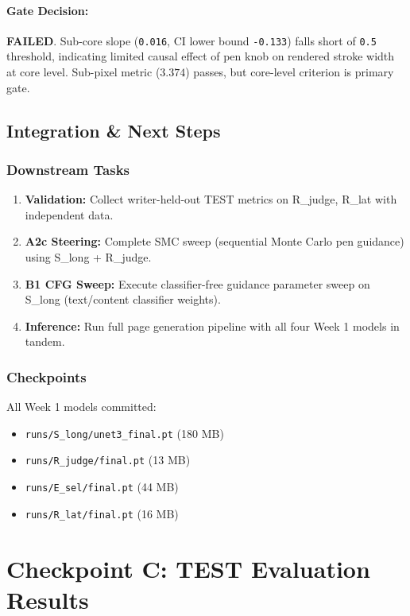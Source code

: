 \documentclass[10.5pt,a4paper]{article}
\newcommand{\fp}[1]{\nolinkurl{#1}}
\begin{document}
\paragraph{Gate Decision:} \textbf{FAILED}. Sub-core slope (\texttt{0.016}, CI lower bound \texttt{-0.133}) falls short of \texttt{0.5} threshold, indicating limited causal effect of pen knob on rendered stroke width at core level. Sub-pixel metric ($3.374$) passes, but core-level criterion is primary gate.

\subsection{Integration \& Next Steps}

\subsubsection{Downstream Tasks}

\begin{enumerate}
    \item \textbf{Validation:} Collect writer-held-out TEST metrics on R\_judge, R\_lat with independent data.
    \item \textbf{A2c Steering:} Complete SMC sweep (sequential Monte Carlo pen guidance) using S\_long + R\_judge.
    \item \textbf{B1 CFG Sweep:} Execute classifier-free guidance parameter sweep on S\_long (text/content classifier weights).
    \item \textbf{Inference:} Run full page generation pipeline with all four Week 1 models in tandem.
\end{enumerate}

\subsubsection{Checkpoints}

All Week 1 models committed:
\begin{itemize}
    \item \fp{runs/S_long/unet3_final.pt} (180 MB)
    \item \fp{runs/R_judge/final.pt} (13 MB)
    \item \fp{runs/E_sel/final.pt} (44 MB)
    \item \fp{runs/R_lat/final.pt} (16 MB)
\end{itemize}

\section{Checkpoint C: TEST Evaluation Results}
\label{sec:checkpointc}
\end{document}
